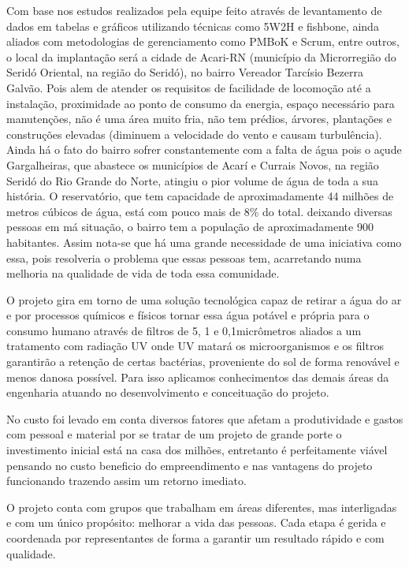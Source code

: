 Com base nos estudos realizados pela equipe feito através de levantamento de dados em tabelas e gráficos utilizando técnicas como
5W2H e fishbone, ainda aliados com metodologias de gerenciamento como PMBoK e Scrum, entre outros, o local da implantação será
a cidade de Acari-RN (município da Microrregião do Seridó Oriental, na região do Seridó), no bairro 
Vereador Tarcísio Bezerra Galvão. Pois alem de atender os requisitos de facilidade de locomoção até a instalação,
proximidade ao ponto de consumo da energia, espaço necessário para manutenções, não é uma área muito fria, não tem prédios,
árvores, plantações e construções elevadas (diminuem a velocidade do vento e causam turbulência). Ainda há o fato do bairro
sofrer constantemente com a falta de água pois o  açude Gargalheiras, que abastece os municípios de Acarí e Currais Novos,
na região Seridó do Rio Grande do Norte, atingiu o pior volume de água de toda a sua história.
O reservatório, que tem capacidade de aproximadamente 44 milhões de metros cúbicos de água, está com pouco mais de 8\% do total.
deixando diversas pessoas em má situação, o bairro tem a  população de aproximadamente 900 habitantes.
Assim nota-se que há uma grande necessidade de uma iniciativa como essa, pois resolveria o problema que essas pessoas tem,
acarretando numa melhoria na qualidade de vida de toda essa comunidade.

O projeto gira em torno de uma solução tecnológica  capaz de retirar a água do ar e por processos químicos e físicos
tornar essa água potável e própria para o consumo humano através de filtros de 5, 1 e 0,1micrômetros aliados a um tratamento
com radiação UV onde UV matará os microorganismos e os filtros garantirão a retenção de certas bactérias, proveniente do sol
de forma renovável e menos danosa possível. Para isso aplicamos conhecimentos das demais áreas da engenharia atuando no 
desenvolvimento e conceituação do projeto. 

No custo foi levado em conta diversos fatores que afetam a produtividade e gastos com pessoal e material por se tratar
de um projeto de grande porte o investimento inicial está na casa dos milhões, entretanto é perfeitamente viável pensando
no custo beneficio do empreendimento e nas vantagens do projeto funcionando trazendo assim um retorno imediato.

O projeto conta com grupos que trabalham em áreas diferentes, mas interligadas e com um único propósito: melhorar 
a vida das pessoas. Cada etapa é gerida e coordenada por representantes de forma a garantir um resultado rápido e com
qualidade.

